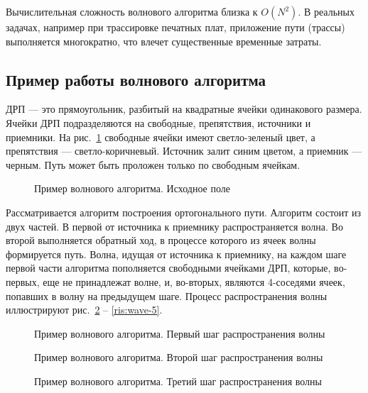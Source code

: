 Вычислительная сложность волнового алгоритма близка к $O(N^2)$.
В реальных задачах, например при трассировке печатных плат, приложение пути (трассы) выполняется многократно, что влечет существенные временные затраты. \cite{graph-wave}

\subsection{Пример работы волнового алгоритма}


ДРП --- это прямоугольник, разбитый на квадратные ячейки одинакового размера. 
Ячейки ДРП подразделяются на свободные, препятствия, источники и приемники. 
На рис.~\ref{ris:wave-1} свободные ячейки имеют светло-зеленый цвет, а препятствия --- светло-коричневый.
Источник залит синим цветом, а приемник --- черным.
Путь может быть проложен только по свободным ячейкам.
\begin{figure}[ht]
\caption{Пример волнового алгоритма. Исходное поле}
\label{ris:wave-1}
\end{figure}

Рассматривается алгоритм построения ортогонального пути. 
Алгоритм состоит из двух частей. 
В первой от источника к приемнику распространяется волна. 
Во второй выполняется обратный ход, в процессе которого из ячеек волны формируется путь.
Волна, идущая от источника к приемнику, на каждом шаге первой части алгоритма пополняется свободными ячейками ДРП, которые, во-первых, еще не принадлежат волне, и, во-вторых, являются 4-соседями ячеек, попавших в волну на предыдущем шаге.
Процесс распространения волны иллюстрируют рис.~\ref{ris:wave-2} -- \ref{ris:wave-5}.

\begin{figure}[ht]
\caption{Пример волнового алгоритма. Первый шаг распространения волны}
\label{ris:wave-2}
\end{figure}

\begin{figure}[ht]
\caption{Пример волнового алгоритма. Второй шаг распространения волны}
\label{ris:wave-3}
\end{figure}

\begin{figure}[h!t]
\caption{Пример волнового алгоритма. Третий шаг распространения волны}
\label{ris:wave-4}
\end{figure}

